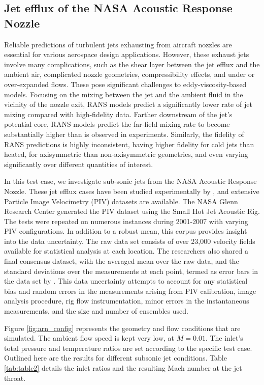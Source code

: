 \subsection{Jet efflux of the NASA Acoustic Response Nozzle}


Reliable predictions of turbulent jets exhausting from aircraft nozzles are essential for various aerospace design applications.
However, these exhaust jets involve many complications, such as the shear layer between the jet efflux and the ambient air, complicated nozzle geometries, compressibility effects, and under or over-expanded flows.
These pose significant challenges to eddy-viscosity-based models.
Focusing on the mixing between the jet and the ambient fluid in the vicinity of the nozzle exit, RANS models predict a significantly lower rate of jet mixing compared with high-fidelity data.
Farther downstream of the jet's potential core, RANS models predict the far-field mixing rate to become substantially higher than is observed in experiments.
Similarly, the fidelity of RANS predictions is highly inconsistent, having higher fidelity for cold jets than heated, for axisymmetric than non-axisymmetric geometries, and even varying significantly over different quantities of interest.

In this test case, we investigate sub-sonic jets from the NASA Acoustic Response Nozzle.
These jet efflux cases have been studied experimentally by \cite{nasajet}, and extensive Particle Image Velocimetry (PIV) datasets are available.
The NASA Glenn Research Center generated the PIV dataset using the Small Hot Jet Acoustic Rig.
The tests were repeated on numerous instances during 2001-2007 with varying PIV configurations.
In addition to a robust mean, this corpus provides insight into the data uncertainty.
The raw data set consists of over 23,000 velocity fields available for statistical analysis at each location.
The researchers also shared a final consensus dataset, with the averaged mean over the raw data, and the standard deviations over the measurements at each point, termed as error bars in the data set by \cite{nasajet}. 
This data uncertainty attempts to account for any statistical bias and random errors in the measurements arising from PIV calibration, image analysis procedure, rig flow instrumentation, minor errors in the instantaneous measurements, and the size and number of ensembles used. 

Figure \ref{fig:arn_config} represents the geometry and flow conditions that are simulated. The ambient flow speed is kept very low, at $M = 0.01$. The inlet's total pressure and temperature ratios are set according to the specific test case.
Outlined here are the results for different subsonic jet conditions.
Table \ref{tab:table2} details the inlet ratios and the resulting Mach number at the jet throat.

